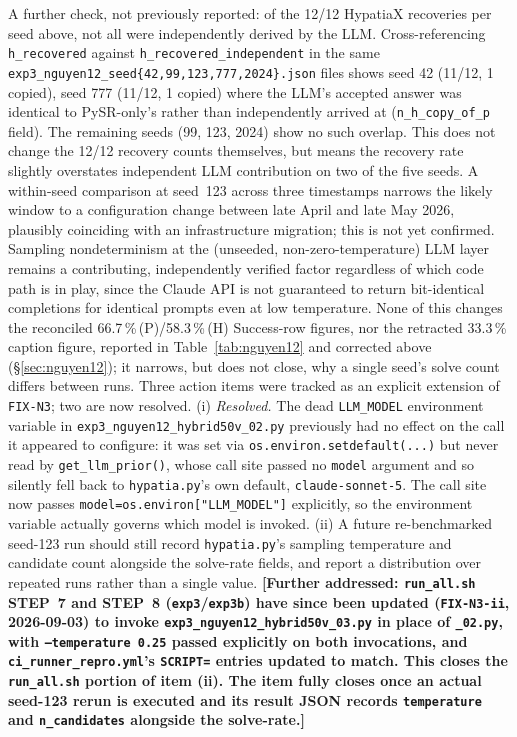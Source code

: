 \documentclass[twoside,11pt]{article}
\begin{document}
A further check, not previously reported: of the 12/12 HypatiaX recoveries per seed above, not all were independently derived by the LLM. Cross-referencing \texttt{h\_recovered} against \texttt{h\_recovered\_independent} in the same \texttt{exp3\_nguyen12\_seed\{42,99,123,777,2024\}.json} files shows seed 42 (11/12, 1 copied), seed 777 (11/12, 1 copied) where the LLM's accepted answer was identical to PySR-only's rather than independently arrived at (\texttt{n\_h\_copy\_of\_p} field). The remaining seeds (99, 123, 2024) show no such overlap. This does not change the 12/12 recovery counts themselves, but means the recovery rate slightly overstates independent LLM contribution on two of the five seeds.
A within-seed comparison at seed~123 across three
timestamps narrows the likely window to a configuration change between
late April and late May 2026, plausibly coinciding with an infrastructure
migration; this is not yet confirmed. Sampling nondeterminism at the
(unseeded, non-zero-temperature) LLM layer remains a contributing,
independently verified factor regardless of which code path is in play,
since the Claude API is not guaranteed to return bit-identical completions
for identical prompts even at low temperature. None of this changes the reconciled 66.7\,\%\,(P)/58.3\,\%\,(H) Success-row
figures, nor the retracted 33.3\,\% caption figure, reported in
Table~\ref{tab:nguyen12} and corrected above (\S\ref{sec:nguyen12}); it
narrows, but does not close, why a single seed's solve count differs
between runs. Three action items were tracked as an explicit extension of
\texttt{FIX-N3}; two are now resolved. (i) \emph{Resolved.} The dead
\texttt{LLM\_MODEL} environment variable in
\texttt{exp3\_nguyen12\_hybrid50v\_02.py} previously had no effect on
the call it appeared to configure: it was set via
\texttt{os.environ.setdefault(...)} but never read by
\texttt{get\_llm\_prior()}, whose call site passed no \texttt{model}
argument and so silently fell back to \texttt{hypatia.py}'s own default,
\texttt{claude-sonnet-5}. The call site now passes
\texttt{model=os.environ["LLM\_MODEL"]} explicitly, so the environment
variable actually governs which model is invoked. (ii) A future re-benchmarked seed-123 run should still record
\texttt{hypatia.py}'s sampling temperature and candidate count alongside
the solve-rate fields, and report a distribution over repeated runs rather
than a single value.  \textbf{[Further addressed: \texttt{run\_all.sh}
STEP~7 and STEP~8 (\texttt{exp3}/\texttt{exp3b}) have since been updated
(\texttt{FIX-N3-ii}, 2026-09-03) to invoke
\texttt{exp3\_nguyen12\_hybrid50v\_03.py} in place of \texttt{\_02.py}, with
\texttt{--temperature 0.25} passed explicitly on both invocations, and
\texttt{ci\_runner\_repro.yml}'s \texttt{SCRIPT=} entries updated to match.
This closes the \texttt{run\_all.sh} portion of item (ii). The item fully
closes once an actual seed-123 rerun is executed and its result JSON
records \texttt{temperature} and \texttt{n\_candidates} alongside the
solve-rate.]}
\end{document}
